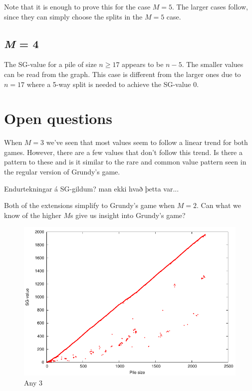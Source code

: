 \documentclass[english,a4paper,twoside]{amsart}
\theoremstyle{definition}
\begin{document}
Note that it is enough to prove this for the case $M = 5$. The larger cases follow, since they can
simply choose the splits in the $M=5$ case.
\subsection{\emph{M} = 4}
The SG-value for a pile of size $n\geq 17$ appears to be $n-5$.
The smaller values can be read from the graph.
This case is different from the larger ones due to $n=17$ where a 5-way split is needed to achieve
the SG-value 0.


\section{Open questions}

When $M=3$ we've seen that most values seem to follow a linear trend for both games. However, there
are a few values that don't follow this trend. Is there a pattern to these and is it similar to
the rare and common value pattern seen in the regular version of Grundy's game.

Endurtekningar á SG-gildum? man ekki hvað þetta var...

Both of the extensions simplify to Grundy's game when $M=2$. Can what we know of the higher
$M$s give us insight into Grundy's game?



\newpage

\begin{figure}
    \includegraphics[width=\linewidth]{../plots/any3_long.pdf}
    \caption{Any 3}
    \label{fig:any3_long}
\end{figure}
\end{document}
